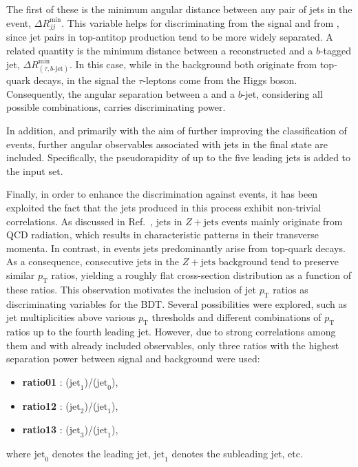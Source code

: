 The first of these is the minimum angular distance between any pair of jets in the event, $\Delta R^{\text{min}}_{jj}$. This variable helps for discriminating \ttbar from the signal and from \ztautau, since jet pairs in top-antitop production tend to be more widely separated. A related quantity is the minimum distance between a reconstructed \tauhad and a $b$-tagged jet, $\Delta R^{\text{min}}_{(\tau,b\text{-jet})}$. In this case, while in the \ttbar background both \tauhad originate from top-quark decays, in the \ttH signal the $\tau$-leptons come from the Higgs boson. Consequently, the angular separation between a \tauhad and a $b$-jet, considering all possible combinations, carries discriminating power. 

In addition, and primarily with the aim of further improving the classification of \ttbar events, further angular observables associated with jets in the final state are included. Specifically, the pseudorapidity of up to the five leading jets is added to the input set.

Finally, in order to enhance the discrimination against \ztautau events, it has been exploited the fact that the jets produced in this process exhibit non-trivial correlations. As discussed in Ref.~\cite{ztt_jets}, jets in $Z+\text{jets}$ events mainly originate from QCD radiation, which results in characteristic patterns in their transverse momenta. In contrast, in \ttH events jets predominantly arise from top-quark decays. As a consequence, consecutive jets in the $Z+\text{jets}$ background tend to preserve similar $p_{\text{T}}$ ratios, yielding a roughly flat cross-section distribution as a function of these ratios. This observation motivates the inclusion of jet $p_{\text{T}}$ ratios as discriminating variables for the BDT.  
Several possibilities were explored, such as jet multiplicities above various $p_{\text{T}}$ thresholds and different combinations of $p_{\text{T}}$ ratios up to the fourth leading jet. However, due to strong correlations among them and with already included observables, only three ratios with the highest separation power between signal and background were used:
\begin{itemize}
    \small
    \item \textbf{ratio01} : \pt($\text{jet}_1$)/\pt($\text{jet}_0$),
    \item \textbf{ratio12} : \pt($\text{jet}_2$)/\pt($\text{jet}_1$),
    \item \textbf{ratio13} : \pt($\text{jet}_3$)/\pt($\text{jet}_1$),
\end{itemize}
where $\text{jet}_0$ denotes the leading jet, $\text{jet}_1$ denotes the subleading jet, etc.


